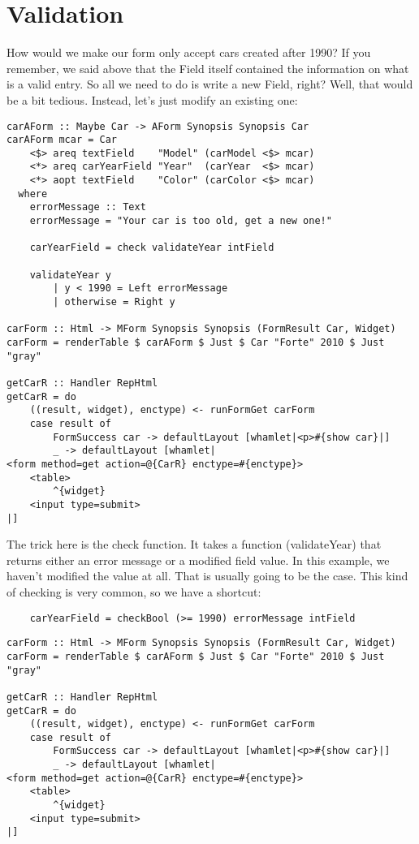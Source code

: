 \section{Validation}

How would we make our form only accept cars created after 1990? If you remember, we said above that the Field itself contained the information on what is a valid entry. So all we need to do is write a new Field, right? Well, that would be a bit tedious. Instead, let's just modify an existing one:

\begin{lstlisting}
carAForm :: Maybe Car -> AForm Synopsis Synopsis Car
carAForm mcar = Car
    <$> areq textField    "Model" (carModel <$> mcar)
    <*> areq carYearField "Year"  (carYear  <$> mcar)
    <*> aopt textField    "Color" (carColor <$> mcar)
  where
    errorMessage :: Text
    errorMessage = "Your car is too old, get a new one!"

    carYearField = check validateYear intField

    validateYear y
        | y < 1990 = Left errorMessage
        | otherwise = Right y

carForm :: Html -> MForm Synopsis Synopsis (FormResult Car, Widget)
carForm = renderTable $ carAForm $ Just $ Car "Forte" 2010 $ Just "gray"

getCarR :: Handler RepHtml
getCarR = do
    ((result, widget), enctype) <- runFormGet carForm
    case result of
        FormSuccess car -> defaultLayout [whamlet|<p>#{show car}|]
        _ -> defaultLayout [whamlet|
<form method=get action=@{CarR} enctype=#{enctype}>
    <table>
        ^{widget}
    <input type=submit>
|]
\end{lstlisting}

The trick here is the check function. It takes a function (validateYear) that returns either an error message or a modified field value. In this example, we haven't modified the value at all. That is usually going to be the case. This kind of checking is very common, so we have a shortcut:

\begin{lstlisting}
    carYearField = checkBool (>= 1990) errorMessage intField
\end{lstlisting}

\begin{lstlisting}
carForm :: Html -> MForm Synopsis Synopsis (FormResult Car, Widget)
carForm = renderTable $ carAForm $ Just $ Car "Forte" 2010 $ Just "gray"

getCarR :: Handler RepHtml
getCarR = do
    ((result, widget), enctype) <- runFormGet carForm
    case result of
        FormSuccess car -> defaultLayout [whamlet|<p>#{show car}|]
        _ -> defaultLayout [whamlet|
<form method=get action=@{CarR} enctype=#{enctype}>
    <table>
        ^{widget}
    <input type=submit>
|]
\end{lstlisting}

